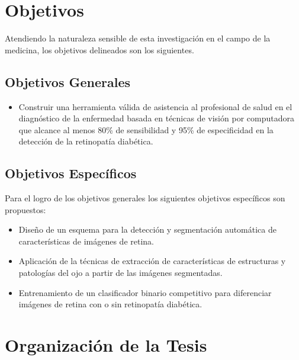 \section{Objetivos}
Atendiendo la naturaleza sensible  de esta investigación en el campo de la medicina,  los  objetivos delineados son los siguientes.

\subsection{Objetivos Generales}

\begin{itemize}
\item Construir una herramienta válida de asistencia al profesional de salud en el diagnóstico de la enfermedad basada en técnicas de visión por computadora que alcance al menos 80\% de sensibilidad y 95\% de especificidad en la detección de la retinopatía diabética.
\end{itemize}
\subsection{Objetivos Específicos}
Para el logro de los objetivos generales los siguientes objetivos específicos son propuestos:
\begin{itemize}


\item Diseño de un esquema para la detección y segmentación automática de características de imágenes de retina.

   
    
    

\item Aplicación de la técnicas de extracción de características de estructuras y patologías del ojo a partir de las imágenes segmentadas.
    
\item Entrenamiento de un clasificador binario competitivo para diferenciar imágenes de retina con o sin retinopatía diabética.



\end{itemize}





\section{Organización de la Tesis}

